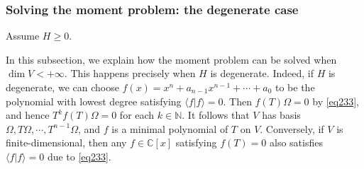 \documentclass[12pt,b5paper,notitlepage]{article}
\theoremstyle{definition}
\newtheorem{rem}[df]{Remark}
\theoremstyle{plain}
\newcommand{\wtd}{\widetilde}
\newcommand{\ovl}{\overline}
\newcommand{\bk}[1]{\langle {#1}\rangle}
\newcommand{\bigbk}[1]{\big\langle {#1}\big\rangle}
\newcommand{\Cbb}{\mathbb C}
\newcommand{\Nbb}{\mathbb N}
\numberwithin{equation}{section}
\begin{document}
\begin{comment}
\begin{rem}
The triple $(V,\Omega,T)$ satisfying the requirements in Thm. \ref{lb167} are unique up to unitary operators. Namely, if $(\wtd V,\wtd\Omega,\wtd T)$ is another triple satisfying the requirements in Thm. \ref{lb167}, then there is a (necessarily unique) unitary operator $\Phi:V\rightarrow\wtd V$ satisfying $\Phi\Omega=\wtd\Omega$ and $\Phi T=\wtd T\Phi$.
\end{rem}


\begin{proof}
For each $f\in\Cbb[x]$, since $\omega_T$ is Hermitian, we have $\bk{\eta|f(T)\xi}=\bk{\ovl f(T)\eta|\xi}$ for each $\xi,\eta\in V$. A similar property holds for $\wtd T$. Therefore, 
\begin{align*}
\bigbk{f(T)\Omega\big|f(T)\Omega}=\bigbk{\Omega\big||f|^2(T)\Omega}=\bigbk{\wtd\Omega\big||f|^2(\wtd T)\wtd\Omega}=\bigbk{f(\wtd T)\wtd\Omega\big|f(\wtd T)\wtd\Omega}
\end{align*}
In particular, $f(T)\Omega=0$ iff $f(\wtd T)\wtd\Omega=0$. Therefore, by the algebraic cyclicity, we have a unitary map
\begin{align}
\Phi:V\rightarrow\wtd V\qquad f(T)\Omega\mapsto f(\wtd T)\wtd\Omega
\end{align}
This map clearly satisfies the desired property.

Conversely, if $\Phi$ satisfies the requirements in the remark, then $\Phi$ must send $f(T)\Omega$ to $f(\wtd T)\wtd\Omega$. Therefore, such $\Phi$ must be unique. 
\end{proof}
\end{comment}





\subsubsection{Solving the moment problem: the degenerate case}

Assume $H\geq0$.

In this subsection, we explain how the moment problem can be solved when $\dim V<+\infty$. This happens precisely when $H$ is degenerate. Indeed, if $H$ is degenerate, we can choose $f(x)=x^n+a_{n-1}x^{n-1}+\cdots+a_0$ to be the polynomial with lowest degree satisfying $\bk{f|f}=0$. Then $f(T)\Omega=0$ by \eqref{eq233}, and hence $T^kf(T)\Omega=0$ for each $k\in\Nbb$. It follows that $V$ has basis $\Omega,T\Omega,\cdots,T^{n-1}\Omega$, and $f$ is a minimal polynomial of $T$ on $V$. Conversely, if $V$ is finite-dimensional, then any $f\in\Cbb[x]$ satisfying $f(T)=0$ also satisfies $\bk{f|f}=0$ due to \eqref{eq233}.
\end{document}
